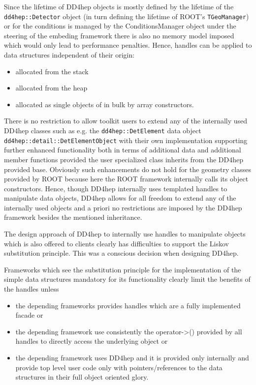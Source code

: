 Since the lifetime of DD4hep objects is mostly defined by the lifetime of the {\texttt{dd4hep::Detector}} object (in turn defining the lifetime of ROOT's {\texttt{TGeoManager}}) or for the conditions is managed by the ConditionsManager object under the steering of the embeding framework there is also no memory model imposed which would only lead to performance penalties. Hence, handles can be applied to data structures independent of their origin:
\begin{itemize}
\item allocated from the stack
\item allocated from the heap
\item allocated as single objects of in bulk by array constructors.
\end{itemize}

There is no restriction to allow toolkit users to extend any of the internally used DD4hep classes such as e.g. the {\texttt{dd4hep::DetElement}} data object {\texttt{dd4hep::detail::DetElementObject}} with their own implementation supporting further enhanced functionality both in terms of additional data and additional member functions provided the user specialized class inherits from the DD4hep provided base. Obviously such enhancements do not hold for the geometry classes provided by ROOT because here the ROOT framework internally calls its object constructors. Hence, though DD4hep internally uses templated handles to manipulate data objects, DD4hep allows for all freedom to extend any of the internally used objects and a priori no restrictions are imposed by the DD4hep framework besides the mentioned inheritance.

The design approach of DD4hep to internally use handles to manipulate objects which is also offered to clients clearly has difficulties to support the Liskov substitution principle. This was a conscious decision when designing DD4hep.

Frameworks which see the substitution principle for the implementation of the simple data structures mandatory for its functionality clearly limit the  benefits of the handles unless

\begin{itemize}
\item the depending frameworks provides handles which are a fully implemented facade or
\item the depending framework use consistently the operator->() provided by all   handles to directly access the underlying object or
\item the depending framework uses DD4hep and it is provided only internally and provide top level user code only with pointers/references to the data structures in their full object oriented glory.
\end{itemize}

